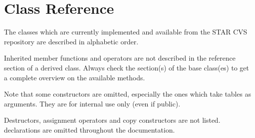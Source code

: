\newpage


\section{Class Reference}
The classes which are currently implemented and available from the
STAR CVS repository are described in alphabetic order.

Inherited member functions and operators are not described in the
reference section of a derived class. Always check the section(s)
of the base class(es) to get a complete overview on the available
methods.

Note that some constructors are omitted, especially the ones which
take tables as arguments. They are for internal use only (even if
public).

Destructors, assignment operators and copy constructors are not
listed.   declarations are omitted throughout the
documentation.

\clearpage


%
%
